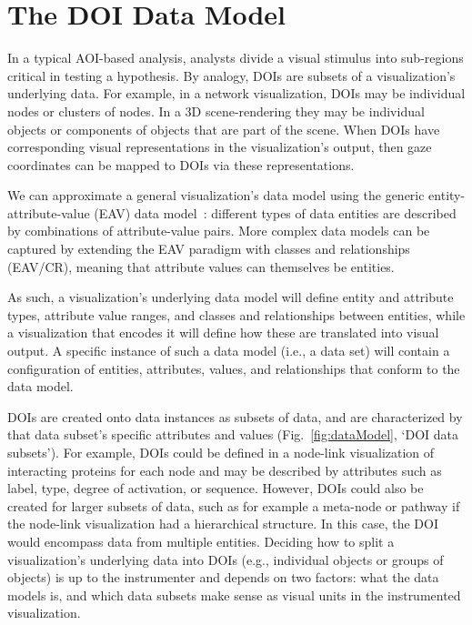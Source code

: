 \section{The DOI Data Model}
\label{sec:DataModel}
In a typical AOI-based analysis, analysts divide a visual stimulus into sub-regions critical in testing a hypothesis. By analogy, DOIs are subsets of a visualization's underlying data. For example, in a network visualization, DOIs may be individual nodes or clusters of nodes. In a 3D scene-rendering they may be individual objects or components of objects that are part of the scene. When DOIs have corresponding visual representations in the visualization's output, then gaze coordinates can be mapped to DOIs via these representations. 

We can approximate a general visualization's data model using the generic entity-attribute-value (EAV) data model~\cite{deran1991entity}: different types of data entities are described by combinations of attribute-value pairs. More complex data models can be captured by extending the EAV paradigm with classes and relationships (EAV/CR), meaning that attribute values can themselves be entities. 

As such, a visualization's underlying data model will define entity and attribute types, attribute value ranges, and classes and relationships between entities, while a visualization that encodes it will define how these are translated into visual output. A specific instance of such a data model (i.e., a data set) will contain a configuration of entities, attributes, values, and relationships that conform to the data model. 

DOIs are created onto data instances as subsets of data, and are characterized by that data subset's specific attributes and values (Fig.~\ref{fig:dataModel}, `DOI data subsets'). For example, DOIs could be defined in a node-link visualization of interacting proteins for each node and may be described by attributes such as label, type, degree of activation, or sequence. However, DOIs could also be created for larger subsets of data, such as for example a meta-node or pathway if the node-link visualization had a hierarchical structure. In this case, the DOI would encompass data from multiple entities. Deciding how to split a visualization's underlying data into DOIs (e.g., individual objects or groups of objects) is up to the instrumenter and depends on two factors: what the data models is, and which data subsets make sense as visual units in the instrumented visualization. 

